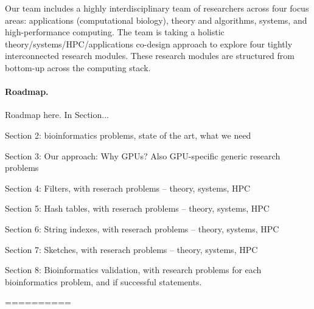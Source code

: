 Our team includes a highly interdisciplinary team of researchers across four focus areas: applications (computational biology), theory and algorithms, systems, and high-performance computing. The team is taking a holistic theory/systems/HPC/applications co-design approach to explore four tightly interconnected research modules. These research modules are structured from bottom-up across the computing stack.


\paragraph{Roadmap.} Roadmap here. In Section...

Section 2: bioinformatics problems, state of the art, what we need

Section 3: Our approach: Why GPUs?  Also GPU-specific generic research problems

Section 4: Filters, with reserach problems -- theory, systems, HPC

Section 5: Hash tables, with reserach problems -- theory, systems, HPC

Section 6: String indexes, with reserach problems -- theory, systems, HPC

Section 7: Sketches, with reserach problems -- theory, systems, HPC

Section 8: Bioinformatics validation, with research problems for each bioinformatics problem, and if successful statements.

\iffalse
==========



